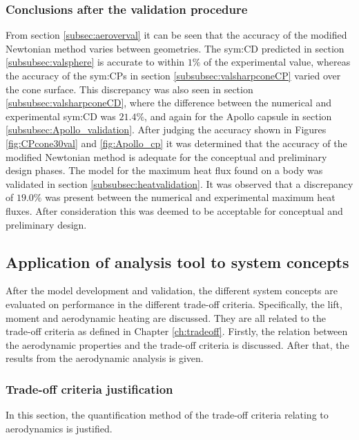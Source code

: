 \subsubsection{Conclusions after the validation procedure}
\label{subsec:validconclusions}
From section \ref{subsec:aeroverval} it can be seen that the accuracy of the modified Newtonian method varies between geometries. The \gls{sym:CD} predicted in section \ref{subsubsec:valsphere} is accurate to within $1\%$ of the experimental value, whereas the accuracy of the \glspl{sym:CP} in section \ref{subsubsec:valsharpconeCP} varied over the cone surface. This discrepancy was also seen in section \ref{subsubsec:valsharpconeCD}, where the difference between the numerical and experimental \gls{sym:CD} was $21.4\%$, and again for the Apollo capsule in section \ref{subsubsec:Apollo_validation}. After judging the accuracy shown in Figures \ref{fig:CPcone30val} and \ref{fig:Apollo_cp} it was determined that the accuracy of the modified Newtonian method is adequate for the conceptual and preliminary design phases.
The model for the maximum heat flux found on a body was validated in section \ref{subsubsec:heatvalidation}. It was observed that a discrepancy of $19.0\%$ was present between the numerical and experimental maximum heat fluxes. After consideration this was deemed to be acceptable for conceptual and preliminary design.

\subsection{Application of analysis tool to system concepts}
\label{subsec:appaeroanal}
After the model development and validation, the different system concepts are evaluated on performance in the different trade-off criteria. Specifically, the lift, moment and aerodynamic heating are discussed. They are all related to the trade-off criteria as defined in Chapter \ref{ch:tradeoff}. Firstly, the relation between the aerodynamic properties and the trade-off criteria is discussed. After that, the results from the aerodynamic analysis is given.



\subsubsection{Trade-off criteria justification} \label{sec:tradeoffaero}
In this section, the quantification method of the trade-off criteria relating to aerodynamics is justified.


